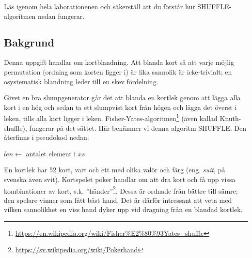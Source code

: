 

\Lab{\LabWeekSIX}

\begin{Goals}

\end{Goals}

\begin{Preparations}
\item {}
\item Läs igenom hela laborationenen och säkerställ att du förstår hur SHUFFLE-algoritmen nedan fungerar.
\end{Preparations}

\subsection{Bakgrund}\label{knuth-shuffle}

Denna uppgift handlar om kortblandning. Att blanda kort så att varje möjlig permutation (ordning som korten ligger i) är lika sannolik är icke-trivialt; en osystematisk blandning leder till en skev fördelning.

Givet en bra slumpgenerator går det att blanda en kortlek genom att lägga alla kort i en hög och sedan ta ett slumpvist kort från högen och lägga det överst i leken, tills alla kort ligger i leken. Fisher-Yates-algoritmen\footnote{\href{https://en.wikipedia.org/wiki/Fisher\%E2\%80\%93Yates_shuffle}{https://en.wikipedia.org/wiki/Fisher\%E2\%80\%93Yates\_shuffle}} (även kallad Knuth-shuffle), fungerar på det sättet. Här benämner vi denna algoritm SHUFFLE. Den återfinns i pseudokod nedan:

\begin{algorithm}[H]
 $len \leftarrow$ antalet element i $xs$ \\
\end{algorithm}

En kortlek  har 52 kort, vart och ett med olika valör  och färg (eng. \emph{suit}, på svenska även svit). Kortspelet poker handlar om att dra kort och få upp vissa kombinationer av kort, s.k. ''händer''\footnote{\href{https://sv.wikipedia.org/wiki/Pokerhand}{https://sv.wikipedia.org/wiki/Pokerhand}}. Dessa är ordnade från bättre till sämre; den spelare vinner som fått bäst hand.
Det är därför intressant att veta med vilken sannolikhet en viss hand dyker upp vid dragning från en blandad kortlek.

